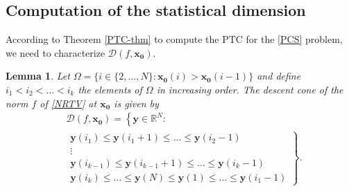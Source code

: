 \documentclass[11pt]{article}
\newcommand{\be}{\begin{equation}}
\newcommand{\ee}{\end{equation}}
\newtheorem{lemma}[proposition]{Lemma}
\begin{document}
\subsection{Computation of the statistical dimension}
According to Theorem \ref{PTC-thm} to compute the PTC for the \ref{PCS} problem, we need to characterize $\mathcal{D}(f,\bm{x_0})$. %
\begin{lemma}
	Let $\Omega = \{ i \in \{2,\ldots,N\} : \bm{x_0}(i) > \bm{x_0}(i-1) \}$ and define $i_1 < i_2 < \ldots < i_k$ the elements of $\Omega$ in increasing order. The descent cone of the norm $f$ of \eqref{NRTV} at $\bm{x_0}$ is given by
	\be 
		\begin{split}
		&\mathcal{D}(f,\bm{x_0})  = \left\{\bm{y}\in\mathbb{R}^N: \right. \\
		&				 \left.
						\begin{array}{c}   \bm{y}(i_1) \leq \bm{y}(i_1+1) \leq \ldots \leq \bm{y}(i_2 - 1) \\
									\vdots \\
									\bm{y}(i_{k-1}) \leq \bm{y}(i_{k-1} + 1) \leq \ldots \leq \bm{y}(i_k -1) \\
									  \bm{y}(i_k) \leq \ldots \leq \bm{y}(N) \leq \bm{y}(1)  \leq \ldots \leq \bm{y}(i_1-1) 
						\end{array}\right\}.		\end{split}
		\label{desc_con_neg}
	\ee
	\label{desc_mon_neg}
\end{lemma}
\end{document}
